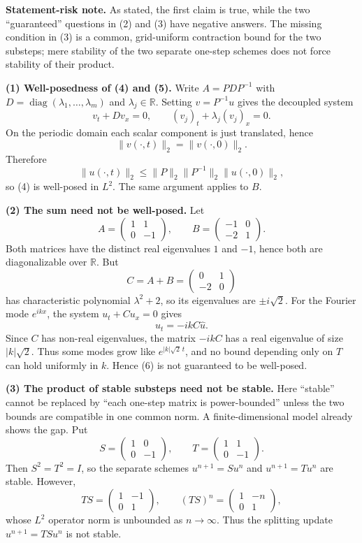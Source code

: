 \begin{solution}
\textbf{Statement-risk note.}
As stated, the first claim is true, while the two ``guaranteed'' questions in (2) and (3)
have negative answers. The missing condition in (3) is a common, grid-uniform contraction
bound for the two substeps; mere stability of the two separate one-step schemes does not
force stability of their product.

\textbf{(1) Well-posedness of (4) and (5).}
Write $A=PDP^{-1}$ with $D=\operatorname{diag}(\lambda_1,\ldots,\lambda_m)$ and
$\lambda_j\in\mathbb R$. Setting $v=P^{-1}u$ gives the decoupled system
\[
v_t+Dv_x=0,\qquad (v_j)_t+\lambda_j(v_j)_x=0.
\]
On the periodic domain each scalar component is just translated, hence
\[
\|v(\cdot,t)\|_2=\|v(\cdot,0)\|_2.
\]
Therefore
\[
\|u(\cdot,t)\|_2\leq \|P\|_2\|P^{-1}\|_2\|u(\cdot,0)\|_2,
\]
so (4) is well-posed in $L^2$. The same argument applies to $B$.

\textbf{(2) The sum need not be well-posed.}
Let
\[
A=
\begin{pmatrix}
1&1\\
0&-1
\end{pmatrix},
\qquad
B=
\begin{pmatrix}
-1&0\\
-2&1
\end{pmatrix}.
\]
Both matrices have the distinct real eigenvalues $1$ and $-1$, hence both are
diagonalizable over $\mathbb R$. But
\[
C=A+B=
\begin{pmatrix}
0&1\\
-2&0
\end{pmatrix}
\]
has characteristic polynomial $\lambda^2+2$, so its eigenvalues are
$\pm i\sqrt 2$. For the Fourier mode $e^{ikx}$, the system
$u_t+Cu_x=0$ gives
\[
\widehat u_t=-ikC\widehat u.
\]
Since $C$ has non-real eigenvalues, the matrix $-ikC$ has a real eigenvalue of size
$|k|\sqrt 2$. Thus some modes grow like $e^{|k|\sqrt 2\,t}$, and no bound depending
only on $T$ can hold uniformly in $k$. Hence (6) is not guaranteed to be well-posed.

\textbf{(3) The product of stable substeps need not be stable.}
Here ``stable'' cannot be replaced by ``each one-step matrix is power-bounded'' unless
the two bounds are compatible in one common norm. A finite-dimensional model already
shows the gap. Put
\[
S=
\begin{pmatrix}
1&0\\
0&-1
\end{pmatrix},
\qquad
T=
\begin{pmatrix}
1&1\\
0&-1
\end{pmatrix}.
\]
Then $S^2=T^2=I$, so the separate schemes $u^{n+1}=Su^n$ and $u^{n+1}=Tu^n$ are
stable. However,
\[
TS=
\begin{pmatrix}
1&-1\\
0&1
\end{pmatrix},
\qquad
(TS)^n=
\begin{pmatrix}
1&-n\\
0&1
\end{pmatrix},
\]
whose $L^2$ operator norm is unbounded as $n\to\infty$. Thus the splitting update
$u^{n+1}=TSu^n$ is not stable.


\end{solution}
